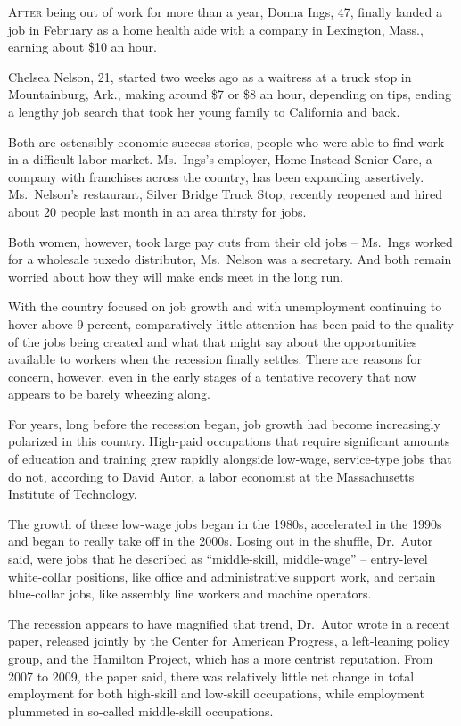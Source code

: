 ﻿\documentclass[12pt]{article}
\begin{document}
\lettrine{A}{fter} being out of work for more than a year, Donna Ings, 47,
finally landed a job in February as a home health aide with a company in Lexington, Mass., earning
about \$10 an hour.

Chelsea Nelson, 21, started two weeks ago as a waitress at a truck stop in Mountainburg, Ark.,
making around \$7 or \$8 an hour, depending on tips, ending a lengthy job search that took her young
family to California and back.

Both are ostensibly economic success stories, people who were able to find work in a difficult labor
market. Ms.~Ings's employer, Home Instead Senior Care, a company with franchises across the country,
has been expanding assertively. Ms.~Nelson's restaurant, Silver Bridge Truck Stop, recently reopened
and hired about 20 people last month in an area thirsty for jobs.

Both women, however, took large pay cuts from their old jobs -- Ms.~Ings worked for a wholesale
tuxedo distributor, Ms.~Nelson was a secretary. And both remain worried about how they will make
ends meet in the long run.

With the country focused on job growth and with unemployment continuing to hover above 9 percent,
comparatively little attention has been paid to the quality of the jobs being created and what that
might say about the opportunities available to workers when the recession finally settles. There are
reasons for concern, however, even in the early stages of a tentative recovery that now appears to
be barely wheezing along.

For years, long before the recession began, job growth had become increasingly polarized in this
country. High-paid occupations that require significant amounts of education and training grew
rapidly alongside low-wage, service-type jobs that do not, according to David Autor, a labor
economist at the Massachusetts Institute of Technology.

The growth of these low-wage jobs began in the 1980s, accelerated in the 1990s and began to really
take off in the 2000s. Losing out in the shuffle, Dr.~Autor said, were jobs that he described as
``middle-skill, middle-wage'' -- entry-level white-collar positions, like office and administrative
support work, and certain blue-collar jobs, like assembly line workers and machine operators.

The recession appears to have magnified that trend, Dr.~Autor wrote in a recent paper, released
jointly by the Center for American Progress, a left-leaning policy group, and the Hamilton Project,
which has a more centrist reputation. From 2007 to 2009, the paper said, there was relatively little
net change in total employment for both high-skill and low-skill occupations, while employment
plummeted in so-called middle-skill occupations.
\end{document}
